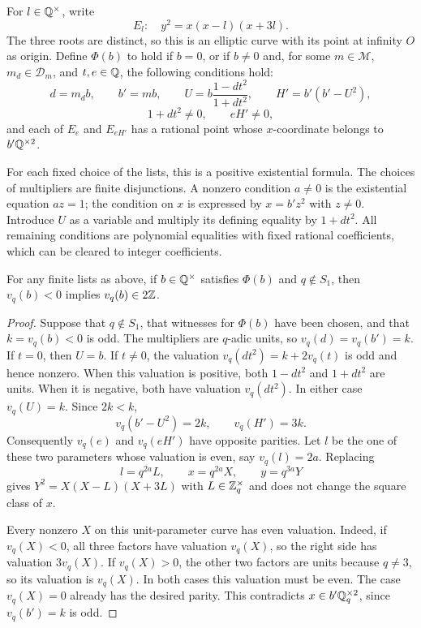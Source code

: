 For $l\in\mathbb Q^\times$, write
\begin{equation}\label{par:curve}
 E_l:\quad y^2=x(x-l)(x+3l).
\end{equation}
The three roots are distinct, so this is an elliptic curve with its
point at infinity $O$ as origin. Define $\Phi(b)$ to hold if $b=0$,
or if $b\ne0$ and, for some $m\in\mathcal M$, $m_d\in\mathcal D_m$,
and $t,e\in\mathbb Q$, the following conditions hold:
\begin{equation}\label{par:auxiliary-functions}
 d=m_db,\qquad b'=mb,\qquad
 U=b\frac{1-dt^2}{1+dt^2},\qquad H'=b'(b'-U^2),
\end{equation}
\[
 1+dt^2\ne0,\qquad eH'\ne0,
\]
and each of $E_e$ and $E_{eH'}$ has a rational point whose
$x$-coordinate belongs to $b'\mathbb Q^{\times2}$.

For each fixed choice of the lists, this is a positive existential
formula. The choices of multipliers are finite disjunctions. A nonzero
condition $a\ne0$ is the existential equation $az=1$; the condition on
$x$ is expressed by $x=b'z^2$ with $z\ne0$. Introduce $U$ as a variable
and multiply its defining equality by $1+dt^2$. All remaining conditions
are polynomial equalities with fixed rational coefficients, which can be
cleared to integer coefficients.

\begin{lemma}\label{par:soundness}
For any finite lists as above, if $b\in\mathbb Q^\times$ satisfies $\Phi(b)$
and $q\notin S_1$, then $v_q(b)<0$ implies $v_q(b)\in2\mathbb Z$.
\end{lemma}

\begin{proof}
Suppose that $q\notin S_1$, that witnesses for $\Phi(b)$ have been
chosen, and that $k=v_q(b)<0$ is odd. The multipliers are $q$-adic
units, so $v_q(d)=v_q(b')=k$. If $t=0$, then $U=b$. If $t\ne0$,
the valuation $v_q(dt^2)=k+2v_q(t)$ is odd and hence nonzero.
When this valuation is positive, both $1-dt^2$ and $1+dt^2$ are
units. When it is negative, both have valuation $v_q(dt^2)$.
In either case $v_q(U)=k$. Since $2k<k$,
\[
 v_q(b'-U^2)=2k,\qquad v_q(H')=3k.
\]
Consequently $v_q(e)$ and $v_q(eH')$ have opposite parities. Let
$l$ be the one of these two parameters whose valuation is even,
say $v_q(l)=2a$. Replacing
\[
 l=q^{2a}L,\qquad x=q^{2a}X,\qquad y=q^{3a}Y
\]
gives $Y^2=X(X-L)(X+3L)$ with $L\in\mathbb Z_q^\times$ and does not
change the square class of $x$.

Every nonzero $X$ on this unit-parameter curve has even valuation.
Indeed, if $v_q(X)<0$, all three factors have valuation $v_q(X)$,
so the right side has valuation $3v_q(X)$. If $v_q(X)>0$, the
other two factors are units because $q\ne3$, so its valuation is
$v_q(X)$. In both cases this valuation must be even. The case
$v_q(X)=0$ already has the desired parity. This contradicts
$x\in b'\mathbb Q_q^{\times2}$, since $v_q(b')=k$ is odd.
\end{proof}


